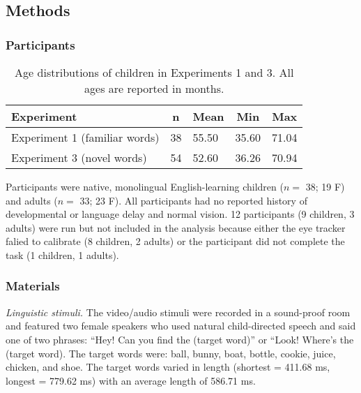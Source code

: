 \documentclass[man,floatsintext]{apa6}
\begin{document}
\subsection{Methods}\label{methods}

\subsubsection{Participants}\label{participants}

\begin{table}[tbp]
\begin{center}
\begin{threeparttable}
\caption{\label{tab:make-ss-table}Age distributions of children in Experiments 1 and 3. All ages are reported in months.}
\begin{tabular}{lllll}
\toprule
Experiment & \multicolumn{1}{c}{n} & \multicolumn{1}{c}{Mean} & \multicolumn{1}{c}{Min} & \multicolumn{1}{c}{Max}\\
\midrule
Experiment 1 (familiar words) & 38 & 55.50 & 35.60 & 71.04\\
Experiment 3 (novel words) & 54 & 52.60 & 36.26 & 70.94\\
\bottomrule
\end{tabular}
\end{threeparttable}
\end{center}
\end{table}

Participants were native, monolingual English-learning children (\(n=\)
38; 19 F) and adults (\(n=\) 33; 23 F). All participants had no reported
history of developmental or language delay and normal vision. 12
participants (9 children, 3 adults) were run but not included in the
analysis because either the eye tracker falied to calibrate (8 children,
2 adults) or the participant did not complete the task (1 children, 1
adults).

\subsubsection{Materials}\label{materials}

\emph{Linguistic stimuli.} The video/audio stimuli were recorded in a
sound-proof room and featured two female speakers who used natural
child-directed speech and said one of two phrases: \enquote{Hey! Can you
find the (target word)} or ``Look! Where's the (target word). The target
words were: ball, bunny, boat, bottle, cookie, juice, chicken, and shoe.
The target words varied in length (shortest = 411.68 ms, longest =
779.62 ms) with an average length of 586.71 ms.
\end{document}
